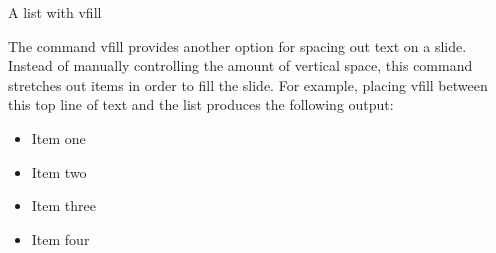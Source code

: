 \begin{frame}{A list with vfill}

The command vfill provides another option for spacing out text on a slide. Instead of manually controlling the amount of vertical space, this command stretches out items in order to fill the slide.  For example, placing vfill between this top line of text and the list produces the following output:

\vfill
\begin{itemize}

\item Item one

\item Item two 

\item Item three 

\item Item four

\end{itemize} 


\end{frame}




